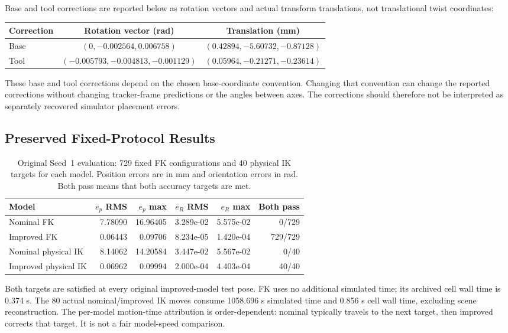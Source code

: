 \documentclass[11pt,letterpaper]{article}
\begin{document}
Base and tool corrections are reported below as rotation vectors and actual transform translations, not translational twist coordinates:
\begin{center}\small
\begin{tabular}{@{}lcc@{}}\toprule
Correction & Rotation vector (rad) & Translation (mm)\\\midrule
Base & $(0,-0.002564,0.006758)$ & $(0.42894,-5.60732,-0.87128)$\\
Tool & $(-0.005793,-0.004813,-0.001129)$ & $(0.05964,-0.21271,-0.23614)$\\\bottomrule
\end{tabular}
\end{center}
These base and tool corrections depend on the chosen base-coordinate convention. Changing that convention can change the reported corrections without changing tracker-frame predictions or the angles between axes. The corrections should therefore not be interpreted as separately recovered simulator placement errors.

\subsection{Preserved Fixed-Protocol Results}
\begin{table}[!htbp]\centering\small
\caption{Original Seed~1 evaluation: 729 fixed FK configurations and 40 physical IK targets for each model. Position errors are in mm and orientation errors in rad. Both pass means that both accuracy targets are met.}\label{tab:official}
\begin{tabular}{@{}lrrrrr@{}}\toprule
Model & $e_p$ RMS & $e_p$ max & $e_R$ RMS & $e_R$ max & Both pass\\\midrule
Nominal FK & 7.78090 & 16.96405 & 3.289e-02 & 5.575e-02 & 0/729\\
Improved FK & 0.06443 & 0.09706 & 8.234e-05 & 1.420e-04 & 729/729\\
Nominal physical IK & 8.14062 & 14.20584 & 3.447e-02 & 5.567e-02 & 0/40\\
Improved physical IK & 0.06962 & 0.09994 & 2.000e-04 & 4.403e-04 & 40/40\\
\bottomrule\end{tabular}
\end{table}
Both targets are satisfied at every original improved-model test pose. FK uses no additional simulated time; its archived cell wall time is 0.374 s. The 80 actual nominal/improved IK moves consume 1058.696 s simulated time and 0.856 s cell wall time, excluding scene reconstruction. The per-model motion-time attribution is order-dependent: nominal typically travels to the next target, then improved corrects that target. It is not a fair model-speed comparison.
\end{document}
